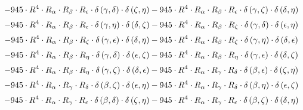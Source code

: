 \begin{subequations}
\begin{gather}
 \\[0.2em] \notag 		 - 945 \cdot R^{4} \cdot R_{\alpha{}} \cdot R_{\beta{}} \cdot R_{\epsilon{}} \cdot \delta{}\left(\gamma{}, \delta{}\right) \cdot \delta{}\left(\zeta{}, \eta{}\right)- 945 \cdot R^{4} \cdot R_{\alpha{}} \cdot R_{\beta{}} \cdot R_{\epsilon{}} \cdot \delta{}\left(\gamma{}, \zeta{}\right) \cdot \delta{}\left(\delta{}, \eta{}\right) 
 \\[0.2em] \notag 		 - 945 \cdot R^{4} \cdot R_{\alpha{}} \cdot R_{\beta{}} \cdot R_{\epsilon{}} \cdot \delta{}\left(\gamma{}, \eta{}\right) \cdot \delta{}\left(\delta{}, \zeta{}\right)- 945 \cdot R^{4} \cdot R_{\alpha{}} \cdot R_{\beta{}} \cdot R_{\zeta{}} \cdot \delta{}\left(\gamma{}, \delta{}\right) \cdot \delta{}\left(\epsilon{}, \eta{}\right) 
 \\[0.2em] \notag 		 - 945 \cdot R^{4} \cdot R_{\alpha{}} \cdot R_{\beta{}} \cdot R_{\zeta{}} \cdot \delta{}\left(\gamma{}, \epsilon{}\right) \cdot \delta{}\left(\delta{}, \eta{}\right)- 945 \cdot R^{4} \cdot R_{\alpha{}} \cdot R_{\beta{}} \cdot R_{\zeta{}} \cdot \delta{}\left(\gamma{}, \eta{}\right) \cdot \delta{}\left(\delta{}, \epsilon{}\right) 
 \\[0.2em] \notag 		 - 945 \cdot R^{4} \cdot R_{\alpha{}} \cdot R_{\beta{}} \cdot R_{\eta{}} \cdot \delta{}\left(\gamma{}, \delta{}\right) \cdot \delta{}\left(\epsilon{}, \zeta{}\right)- 945 \cdot R^{4} \cdot R_{\alpha{}} \cdot R_{\beta{}} \cdot R_{\eta{}} \cdot \delta{}\left(\gamma{}, \epsilon{}\right) \cdot \delta{}\left(\delta{}, \zeta{}\right) 
 \\[0.2em] \notag 		 - 945 \cdot R^{4} \cdot R_{\alpha{}} \cdot R_{\beta{}} \cdot R_{\eta{}} \cdot \delta{}\left(\gamma{}, \zeta{}\right) \cdot \delta{}\left(\delta{}, \epsilon{}\right)- 945 \cdot R^{4} \cdot R_{\alpha{}} \cdot R_{\gamma{}} \cdot R_{\delta{}} \cdot \delta{}\left(\beta{}, \epsilon{}\right) \cdot \delta{}\left(\zeta{}, \eta{}\right) 
 \\[0.2em] \notag 		 - 945 \cdot R^{4} \cdot R_{\alpha{}} \cdot R_{\gamma{}} \cdot R_{\delta{}} \cdot \delta{}\left(\beta{}, \zeta{}\right) \cdot \delta{}\left(\epsilon{}, \eta{}\right)- 945 \cdot R^{4} \cdot R_{\alpha{}} \cdot R_{\gamma{}} \cdot R_{\delta{}} \cdot \delta{}\left(\beta{}, \eta{}\right) \cdot \delta{}\left(\epsilon{}, \zeta{}\right) 
 \\[0.2em] \notag 		 - 945 \cdot R^{4} \cdot R_{\alpha{}} \cdot R_{\gamma{}} \cdot R_{\epsilon{}} \cdot \delta{}\left(\beta{}, \delta{}\right) \cdot \delta{}\left(\zeta{}, \eta{}\right)- 945 \cdot R^{4} \cdot R_{\alpha{}} \cdot R_{\gamma{}} \cdot R_{\epsilon{}} \cdot \delta{}\left(\beta{}, \zeta{}\right) \cdot \delta{}\left(\delta{}, \eta{}\right) 

\end{gather}
\end{subequations}
